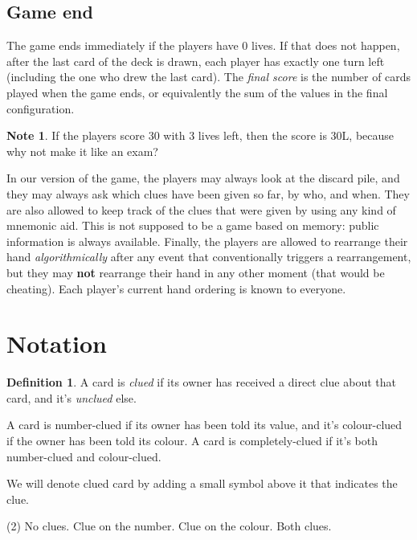 \documentclass[a4paper]{article}
\theoremstyle{plain}
\theoremstyle{definition}
\newtheorem{definition}[theorem]{Definition}
\newtheorem{note}[theorem]{Note}
\begin{document}
\subsection{Game end}

The game ends immediately if the players have 0 lives. If that does not happen, after the last card of the deck is drawn, each player has exactly one turn left (including the one who drew the last card). The \textit{final score} is the number of cards played when the game ends, or equivalently the sum of the values in the final configuration.

\begin{note}
	If the players score 30 with 3 lives left, then the score is 30L, because why not make it like an exam?
\end{note}

In our version of the game, the players may always look at the discard pile, and they may always ask which clues have been given so far, by who, and when. They are also allowed to keep track of the clues that were given by using any kind of mnemonic aid. This is not supposed to be a game based on memory: public information is always available. Finally, the players are allowed to rearrange their hand \textit{algorithmically} after any event that conventionally triggers a rearrangement, but they may \textbf{not} rearrange their hand in any other moment (that would be cheating). Each player's current hand ordering is known to everyone.

\section{Notation}

\begin{definition}
	A card is \textit{clued} if its owner has received a direct clue about that card, and it's \textit{unclued} else.
	
	A card is number-clued if its owner has been told its value, and it's colour-clued if the owner has been told its colour. A card is completely-clued if it's both number-clued and colour-clued.
\end{definition}

We will denote clued card by adding a small symbol above it that indicates the clue.

\begin{tasks}(2)
	\task[$\bullet$] No clues. 
	\task[$\bullet$] Clue on the number. 
	\task[$\bullet$] Clue on the colour. 
	\task[$\bullet$] Both clues. 
\end{tasks}
\end{document}
